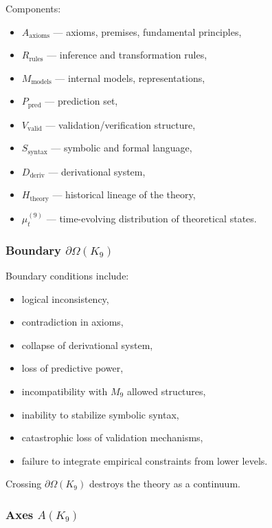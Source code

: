 Components:
\begin{itemize}
    \item $A_{\mathrm{axioms}}$ — axioms, premises, fundamental principles,
    \item $R_{\mathrm{rules}}$ — inference and transformation rules,
    \item $M_{\mathrm{models}}$ — internal models, representations,
    \item $P_{\mathrm{pred}}$ — prediction set,
    \item $V_{\mathrm{valid}}$ — validation/verification structure,
    \item $S_{\mathrm{syntax}}$ — symbolic and formal language,
    \item $D_{\mathrm{deriv}}$ — derivational system,
    \item $H_{\mathrm{theory}}$ — historical lineage of the theory,
    \item $\mu^{(9)}_t$ — time-evolving distribution of theoretical states.
\end{itemize}

\subsubsection{Boundary \texorpdfstring{$\partial\Omega(K_9)$}{\partial\Omega(K_9)}}

Boundary conditions include:
\begin{itemize}
    \item logical inconsistency,
    \item contradiction in axioms,
    \item collapse of derivational system,
    \item loss of predictive power,
    \item incompatibility with $M_9$ allowed structures,
    \item inability to stabilize symbolic syntax,
    \item catastrophic loss of validation mechanisms,
    \item failure to integrate empirical constraints from lower levels.
\end{itemize}

Crossing $\partial\Omega(K_9)$ destroys the theory as a continuum.

\subsubsection{Axes \texorpdfstring{$A(K_9)$}{A(K_9)}}


